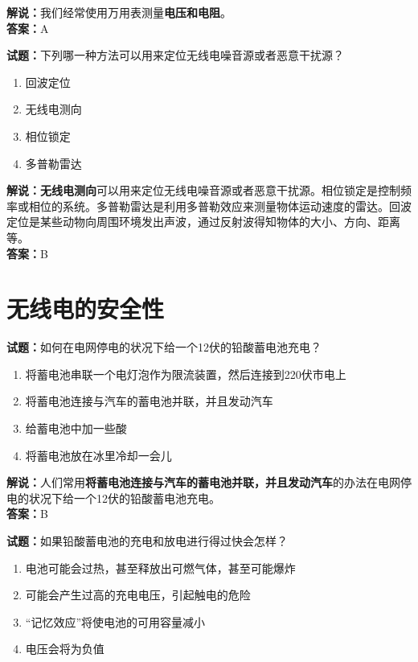 \documentclass{ctexbook}
\begin{document}
\noindent\textbf{解说：}我们经常使用万用表测量\textbf{电压和电阻}。\\\noindent\textbf{答案：}A

\bigskip

\noindent\textbf{试题：}下列哪一种方法可以用来定位无线电噪音源或者恶意干扰源？

\begin{enumerate}[leftmargin=3em]
  \item 回波定位
  \item 无线电测向
  \item 相位锁定
  \item 多普勒雷达
\end{enumerate}

\noindent\textbf{解说：}\textbf{无线电测向}可以用来定位无线电噪音源或者恶意干扰源。相位锁定是控制频率或相位的系统。多普勒雷达是利用多普勒效应来测量物体运动速度的雷达。回波定位是某些动物向周围环境发出声波，通过反射波得知物体的大小、方向、距离等。\\
\noindent\textbf{答案：}B



\chapter{无线电的安全性}

\newpage

\noindent\textbf{试题：}如何在电网停电的状况下给一个\num{12}伏的铅酸蓄电池充电？

\begin{enumerate}[leftmargin=3em]
  \item 将蓄电池串联一个电灯泡作为限流装置，然后连接到\num{220}伏市电上
  \item 将蓄电池连接与汽车的蓄电池并联，并且发动汽车
  \item 给蓄电池中加一些酸
  \item 将蓄电池放在冰里冷却一会儿
\end{enumerate}

\noindent\textbf{解说：}人们常用\textbf{将蓄电池连接与汽车的蓄电池并联，并且发动汽车}的办法在电网停电的状况下给一个12伏的铅酸蓄电池充电。\\\noindent\textbf{答案：}B%

\bigskip

\noindent\textbf{试题：}如果铅酸蓄电池的充电和放电进行得过快会怎样？

\begin{enumerate}[leftmargin=3em]
  \item 电池可能会过热，甚至释放出可燃气体，甚至可能爆炸
  \item 可能会产生过高的充电电压，引起触电的危险
  \item “记忆效应”将使电池的可用容量减小
  \item 电压会将为负值
\end{enumerate}
\end{document}
